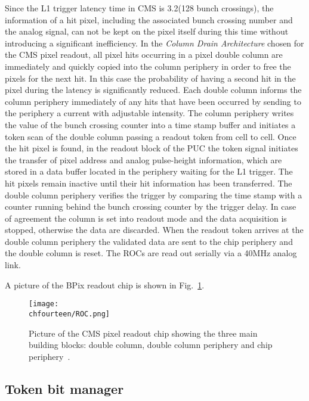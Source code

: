 Since the L1 trigger latency time in CMS is 3.2\mus (128 bunch crossings), the information of a hit pixel, including the associated bunch crossing number and the analog signal, can not be kept on the pixel itself during this time without introducing a significant inefficiency. In the {\itshape Column Drain Architecture} chosen for the CMS pixel readout, all pixel hits occurring in a pixel double column are immediately and quickly copied into the column periphery in order to free the pixels for the next hit. In this case the probability of having a second hit in the pixel during the latency is significantly reduced.
Each double column informs the column periphery immediately of any hits that have been occurred by sending to the periphery a current with adjustable intensity.
The column periphery writes the value of the bunch crossing counter into a time stamp buffer and initiates a token scan of the double column passing a readout token from cell to cell.
Once the hit pixel is found, in the readout block of the PUC the token signal initiates the transfer of pixel address and analog pulse-height information, which are stored in a data buffer located in the periphery waiting for the L1 trigger. The hit pixels remain inactive until their hit information has been transferred.
The double column periphery verifies the trigger by comparing the time stamp with a counter running behind the bunch crossing counter by the trigger delay. In case of agreement the column is set into readout mode and the data acquisition is stopped, otherwise the data are discarded. When the readout token arrives at the double column periphery the validated data are sent to the chip periphery and the double column is reset. The ROCs are read out serially via a 40\unit{MHz} analog link.

A picture of the BPix readout chip is shown in Fig.~\ref{fig:ROC}.

\begin{figure}[!htb]
 \begin{center}
 \texttt{[image: \\chfourteen/ROC.png]}
 \end{center}
 \caption{Picture of the CMS pixel readout chip showing the three main building blocks: double column, double column periphery and chip periphery~\cite{Chatrchyan:2008zzk}.}
 \label{fig:ROC}
\end{figure}

\subsection{Token bit manager}\label{subsec:BPix_TBM}


